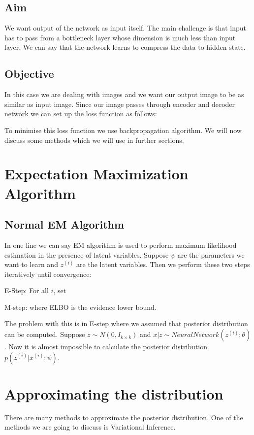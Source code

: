 \documentclass[10pt,a4paper,twoside]{tau-book}
\begin{document}
\subsection{Aim}
We want output of the network as input itself. The main challenge is that input has to pass from a bottleneck layer whose dimension is much less than input layer. We can say that the network learns to compress the data to hidden state.

\subsection{Objective}
In this case we are dealing with images and we want our output image to be as similar as input image. Since our image passes through encoder and decoder network we can set up the loss function as follows:


To minimise this loss function we use backpropagation algorithm. We will now discuss some methods which we will use in further sections.

\section{Expectation Maximization Algorithm}
\subsection{Normal EM Algorithm}
In one line we can say EM algorithm is used to perform maximum likelihood estimation in the presence of latent variables. Suppose $\psi$ are the parameters we want to learn and $z^{(i)}$ are the latent variables. Then we perform these two steps iteratively until convergence:

E-Step: For all $i$, set 

M-step:  where ELBO is the evidence lower bound.

The problem with this is in E-step where we assumed that posterior distribution can be computed. Suppose $z \sim N(0,I_{k \times k})$ and $x | z \sim NeuralNetwork(z^{(i)};\theta)$. Now it is almost impossible to calculate the posterior distribution $p(z^{(i)}|x^{(i)}; \psi)$. 

\section{Approximating the distribution}
There are many methods to approximate the posterior distribution. One of the methods we are going to discuss is Variational Inference.
\end{document}
